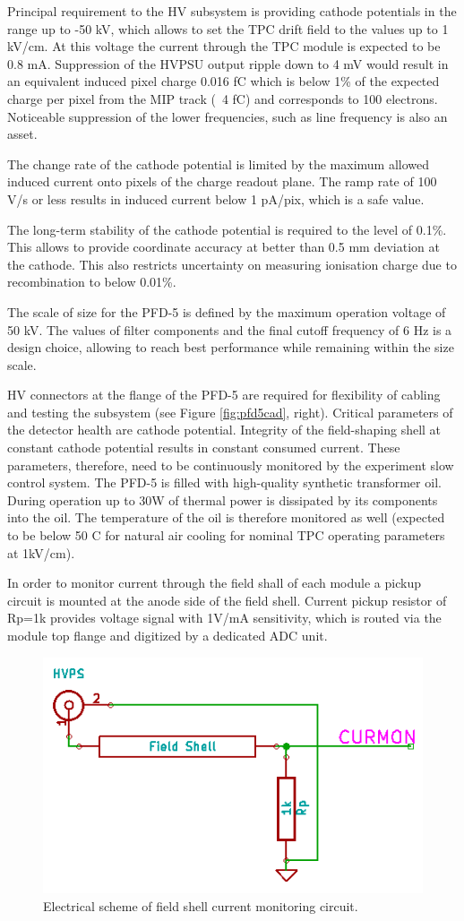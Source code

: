 Principal requirement to the HV subsystem is providing cathode potentials in the range up to -50 kV, which allows to set the TPC drift field to the values up to 1 kV/cm. At this voltage the current through the TPC module is expected to be 0.8 mA.
Suppression of the HVPSU output ripple down to 4 mV would result in an equivalent induced pixel charge 0.016 fC which is below 1\% of the expected charge per pixel from the MIP track (~4 fC) and corresponds to 100 electrons. Noticeable suppression of the lower frequencies, such as line frequency is also an asset. 

The change rate of the cathode potential is limited by the maximum allowed induced current onto pixels of the charge readout plane. The ramp rate of 100 V/s or less results in induced current below 1 pA/pix, which is a safe value.

The long-term stability of the cathode potential is required to the level of 0.1\%. This allows to provide coordinate accuracy
at better than 0.5 mm deviation at the cathode. This also restricts uncertainty on measuring ionisation charge due to recombination to below 0.01\%.

The scale of size for the PFD-5 is defined by the maximum operation voltage of 50 kV. The values of filter components and the final cutoff frequency of 6 Hz is a design choice, allowing to reach best performance while remaining within the size scale.

HV connectors at the flange of the PFD-5 are required for flexibility of cabling and testing the subsystem (see Figure \ref{fig:pfd5cad}, right). 
Critical parameters of the detector health are cathode potential. Integrity of the field-shaping shell at constant cathode potential results in constant consumed current. These parameters, therefore, need to be continuously monitored by the experiment slow control system. The PFD-5 is filled with high-quality synthetic transformer oil. During operation up to 30W of thermal power is dissipated by its components into the oil. The temperature of the oil is therefore monitored as well (expected to be below 50 C for natural air cooling for nominal TPC operating parameters at 1kV/cm). 

In order to monitor current through the field shall of each module a pickup circuit is mounted at the anode side of the field shell. Current pickup resistor of Rp=1k provides voltage signal with 1V/mA sensitivity, which is routed via the module top flange and digitized by a dedicated ADC unit.

\begin{figure}[htbp]
\centering 
\includegraphics[width=0.4\linewidth]{graphics/lartpc/HV/Curmon.png}
\caption{\label{fig:hvcurmon} Electrical scheme of field shell current monitoring circuit.}
\end{figure}

